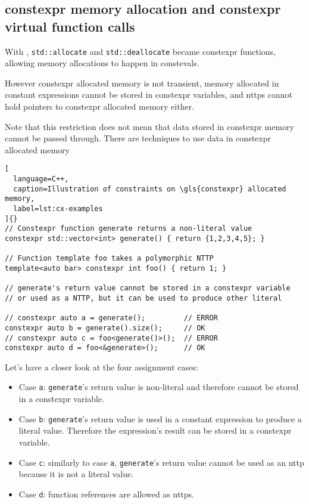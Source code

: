 \documentclass[../main]{subfiles}
\begin{document}
\subsection{
  \gls{constexpr} memory allocation and \gls{constexpr} virtual function calls
}

With , \lstinline{std::allocate} and \lstinline{std::deallocate}
became \gls{constexpr} functions, allowing memory allocations to happen in
\glspl{consteval}.

However \gls{constexpr} allocated memory is not transient, \ie memory allocated in
constant expressions cannot be stored in \gls{constexpr} variables, and \glspl{nttp}
cannot hold pointers to \gls{constexpr} allocated memory either.

Note that this restriction does not mean that data stored in \gls{constexpr} memory
cannot be passed through. There are techniques to use data in \gls{constexpr}
allocated memory

\begin{lstlisting}[
  language=C++,
  caption=Illustration of constraints on \gls{constexpr} allocated memory,
  label=lst:cx-examples
]{}
// Constexpr function generate returns a non-literal value
constexpr std::vector<int> generate() { return {1,2,3,4,5}; }

// Function template foo takes a polymorphic NTTP
template<auto bar> constexpr int foo() { return 1; }

// generate's return value cannot be stored in a constexpr variable
// or used as a NTTP, but it can be used to produce other literal

// constexpr auto a = generate();         // ERROR
constexpr auto b = generate().size();     // OK
// constexpr auto c = foo<generate()>();  // ERROR
constexpr auto d = foo<&generate>();      // OK
\end{lstlisting}

\clearpage%

Let's have a closer look at the four assignment cases:

\begin{itemize}
\item Case \lstinline{a}: \lstinline{generate}'s return value is non-literal
      and therefore cannot be stored in a \gls{constexpr} variable.
\item Case \lstinline{b}: \lstinline{generate}'s return value is used in a
      constant expression to produce a literal value.
      Therefore the expression's result can be stored in a \gls{constexpr} variable.
\item Case \lstinline{c}: similarly to case \lstinline{a},
      \lstinline{generate}'s return value cannot be used as an \gls{nttp} because it
      is not a literal value.
\item Case \lstinline{d}: function references are allowed as \glspl{nttp}.
\end{itemize}
\end{document}
